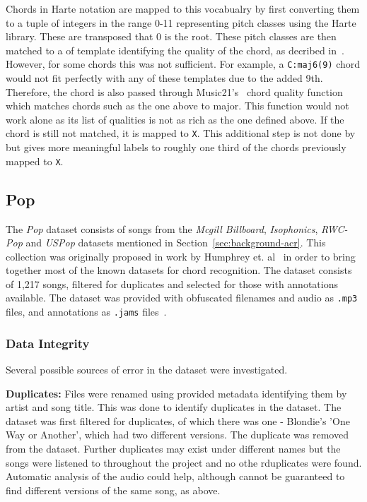 Chords in Harte notation are mapped to this vocabualry by first converting them to a tuple of integers in the range 0-11 representing pitch classes using the Harte library. These are transposed that 0 is the root. These pitch classes are then matched to a of template identifying the quality of the chord, as decribed in~\citep{StructuredTraining}. However, for some chords this was not sufficient. For example, a \texttt{C:maj6(9)} chord would not fit perfectly with any of these templates due to the added 9th. Therefore, the chord is also passed through Music21's~\citep{music21} chord quality function which matches chords such as the one above to major. This function would not work alone as its list of qualities is not as rich as the one defined above. If the chord is still not matched, it is mapped to \texttt{X}. This additional step is not done by \citet{StructuredTraining} but gives more meaningful labels to roughly one third of the chords previously mapped to \texttt{X}.

\subsection{Pop}

The \emph{Pop} dataset consists of songs from the \emph{Mcgill Billboard}, \emph{Isophonics}, \emph{RWC-Pop} and \emph{USPop} datasets mentioned in Section~\ref{sec:background-acr}. This collection was originally proposed in work by Humphrey et. al~\citep{FourTimelyInsights} in order to bring together most of the known datasets for chord recognition. The dataset consists of 1,217 songs, filtered for duplicates and selected for those with annotations available. The dataset was provided with obfuscated filenames and audio as \texttt{.mp3} files, and annotations as \texttt{.jams} files~\citep{JAMS}. 

\subsubsection{Data Integrity}

Several possible sources of error in the dataset were investigated.

\textbf{Duplicates:} Files were renamed using provided metadata identifying them by artist and song title. This was done to identify duplicates in the dataset. The dataset was first filtered for duplicates, of which there was one - Blondie's 'One Way or Another', which had two different versions. The duplicate was removed from the dataset. Further duplicates may exist under different names but the songs were listened to throughout the project and no othe rduplicates were found. Automatic analysis of the audio could help, although cannot be guaranteed to find different versions of the same song, as above.

